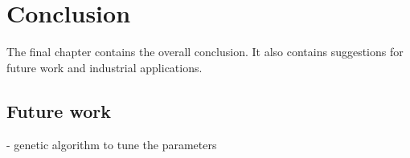 \chapter{Conclusion}
\label{cha:conclusion}
The final chapter contains the overall conclusion. It also contains
suggestions for future work and industrial applications.

\section{Future work}
- genetic algorithm to tune the parameters

